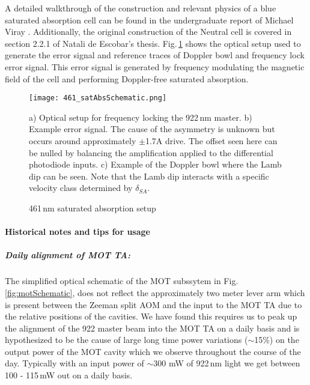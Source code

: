 A detailed walkthrough of the construction and relevant physics of a blue saturated absorption cell can be found in the undergraduate report of Michael Viray \cite{MichaelViray2014}.
Additionally, the original construction of the Neutral cell is covered in section 2.2.1 of Natali de Escobar's thesis.
Fig.\,\ref{fig:blueSatAbs} shows the optical setup used to generate the error signal and reference traces of Doppler bowl and frequency lock error signal.
This error signal is generated by frequency modulating the magnetic field of the cell and performing Doppler-free saturated absorption.
	\begin{figure} 
		\centerline{
		\texttt{[image: 461\_satAbsSchematic.png]}}
		\caption{461\,nm saturated absorption setup}{a) Optical setup for frequency locking the 922\,nm master. b) Example error signal. The cause of the asymmetry is unknown but occurs around approximately $\pm$1.7A drive. The offset seen here can be nulled by balancing the amplification applied to the differential photodiode inputs. c) Example of the Doppler bowl where the Lamb dip can be seen. Note that the Lamb dip interacts with a specific velocity class determined by $\delta_{SA}$.}
		\label{fig:blueSatAbs}
	\end{figure}

\paragraph{Historical notes and tips for usage}
\subparagraph{Daily alignment of MOT TA:}
The simplified optical schematic of the MOT subssytem in Fig.\,\ref{fig:motSchematic}, does not reflect the approximately two meter lever arm which is present between the Zeeman split AOM and the input to the MOT TA due to the relative positions of the cavities.
We have found this requires us to peak up the alignment of the 922 master beam into the MOT TA on a daily basis and is hypothesized to be the cause of large long time power variations ($\sim$15\%) on the output power of the MOT cavity which we observe throughout the course of the day.
Typically with an input power of $\sim$300 mW of 922\,nm light we get between 100 - 115\,mW out on a daily basis.

